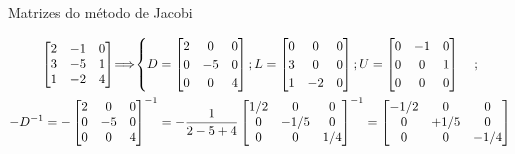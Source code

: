 \documentclass[CN_A-Tests_Resolutions.tex]{subfiles}
\begin{document}
\begin{questionBox}
\begin{questionBox}
    Matrizes do método de Jacobi
    \begin{tcolorbox}
      \begin{gather}
        \begin{bmatrix}
          2 & -1 & 0
          \\ 3 & -5 & 1
          \\ 1 & -2 & 4
        \end{bmatrix}
        \hspace{-.5em}
        \implies
        \hspace{-.5em}
        \begin{cases}
          D = \begin{bmatrix}
            2 &  0 & 0
            \\ 0 & -5 & 0
            \\ 0 &  0 & 4
          \end{bmatrix}
          ; 
          L
          = \begin{bmatrix}
            0 &  0 & 0
            \\ 3 &  0 & 0
            \\ 1 & -2 & 0
          \end{bmatrix}
          ;
          U  = \begin{bmatrix}
            0 & -1 & 0
            \\ 0 &  0 & 1
            \\ 0 &  0 & 0
          \end{bmatrix}
        \end{cases}
        \label{eq:Q9.1 DLU}
        ; \\
        -D^{-1}
        = -\begin{bmatrix}
          2 &  0 & 0
          \\ 0 & -5 & 0
          \\ 0 &  0 & 4
        \end{bmatrix}^{-1}
        = -\frac{1}{2-5+4}
        \begin{bmatrix}
          1/2 &  0 & 0
          \\ 0 & -1/5 & 0
          \\ 0 &  0 & 1/4
        \end{bmatrix}^{-1}
        = 
        \begin{bmatrix}
          -1/2 &  0 & 0
          \\ 0 & +1/5 & 0
          \\ 0 &  0 & -1/4
        \end{bmatrix}
        \label{eq:Q9.1 -D-1}
      \end{gather}
    \end{tcolorbox}


\end{questionBox}
\end{questionBox}
\end{document}
